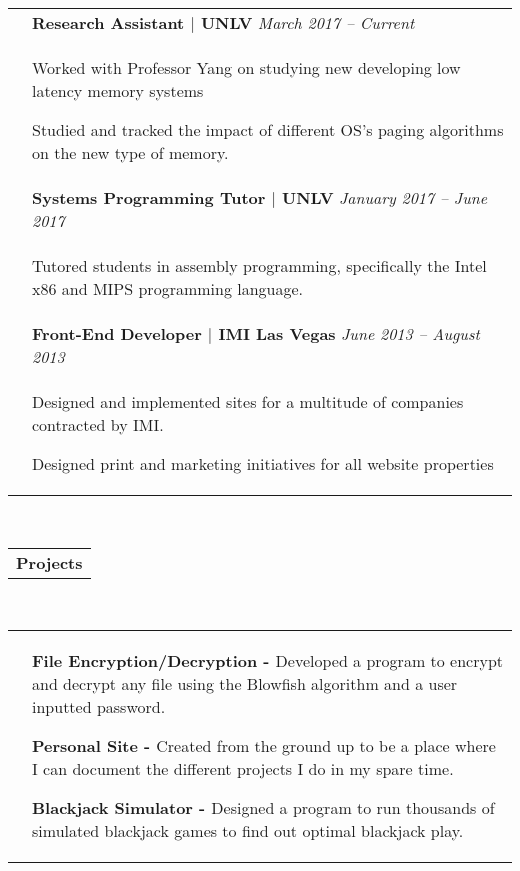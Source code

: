 \documentclass[12pt]{article}
\begin{document}
\begin{tabular}[b]{p{1.3cm} p{14.4cm}}
	& {\bf{Research Assistant $|$ UNLV}} \hfill \emph{\footnotesize{March 2017 -- Current}}
    \\ & \small{ \begin{compactitem}
    	\item Worked with Professor Yang on studying new developing low latency\hyphenation{memory} memory systems
    	\item Studied and tracked the impact of different OS's paging algorithms on the new type of memory.
	\end{compactitem}} \smallskip \\
    & {\bf{Systems Programming Tutor $|$ UNLV}} \hfill \emph{\footnotesize{January 2017 -- June 2017}}
    \\ & \small{ \begin{compactitem}
    	\item Tutored students in assembly programming, specifically the Intel x86 and MIPS programming language.
	\end{compactitem}} \smallskip \\
    & {\bf{Front-End Developer $|$ IMI Las Vegas}} \hfill \emph{\footnotesize{June 2013 -- August 2013}}
    \\ & \small{\begin{compactitem}
    	\item Designed and implemented sites for a multitude of companies contracted by IMI.
        \item Designed print and marketing initiatives for all website properties
	\end{compactitem}}
\end{tabular} \\
\raggedright{\begin{tabular}[b]{p{5.5cm}}
	\bf{\Large{Projects}} \\
    \cline{1-1}
\end{tabular}} \\
	\begin{tabular}[b]{p{.6cm} p{14.4cm}}
	&
    \begin{compactitem}
    	\item \small{\bf{File Encryption/Decryption - }}Developed a program to encrypt and decrypt any file using the Blowfish algorithm and a user inputted password.
	\end{compactitem} \medskip
    \begin{compactitem}
        \item \small{\bf{Personal Site - }}Created from the ground up to be a place where I can document the different projects I do in my spare time.
	\end{compactitem} \medskip
    \begin{compactitem}
        \item \small{\bf{Blackjack Simulator - }}Designed a program to run thousands of simulated blackjack games to find out optimal blackjack play.
	\end{compactitem}
\end{tabular} \\ \medskip
\end{document}
